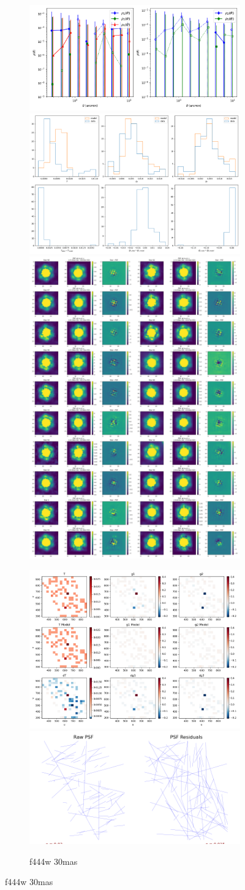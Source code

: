 \documentclass[a4 paper]{article}
\numberwithin{equation}{section}
\newcommand{\0}{\mathbf{0}}
\begin{document}
\begin{figure}[!h]
  \begin{subfigure}{\linewidth}
  \includegraphics[width=.3\linewidth]{444.30/piff_rho.png}\hfill
  \includegraphics[width=.3\linewidth]{444.30/piff_shapes.png}\hfill
  \includegraphics[width=.3\linewidth]{444.30/piff_stars.png}
  \end{subfigure}\par\medskip
  \begin{subfigure}{\linewidth}
  \includegraphics[width=.3\linewidth]{444.30/piff_twod.png}\hfill
  \includegraphics[width=.3\linewidth]{444.30/piff_whisker.png}\hfill
  \caption{f444w 30mas}
  \end{subfigure}\par\medskip


\end{figure}
\end{document}
